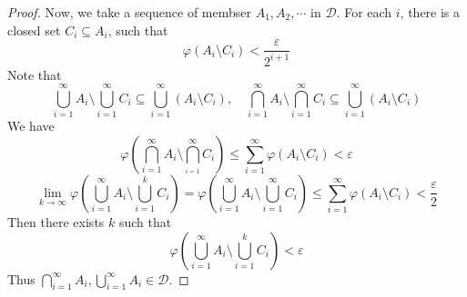 \documentclass[../main.tex]{subfiles}
\begin{document}
\begin{proof}
    Now, we take a sequence of membser \(  A_1,A_2,\cdots   \)  in \(  \mathcal{D}  \). For each \(  i  \), there is a closed set \(  C_{i}\subseteq A_{i}  \), such that \[
     \varphi \left( A_{i}\setminus C_{i} \right)< \frac{ \varepsilon  }{2^{i+ 1} }  
    \]  Note that \[
    \bigcup _{i= 1}^{\infty}A_{i}\setminus \bigcup _{i= 1}^{\infty}C_{i}\subseteq \bigcup _{i= 1}^{\infty}\left( A_{i}\setminus C_{i} \right),\quad \bigcap_{i= 1}^{\infty}A_{i}\setminus \bigcap_{i= 1}^{\infty}C_{i}\subseteq \bigcup _{i= 1}^{\infty}\left( A_{i}\setminus C_{i} \right)    
    \]We have \[
     \varphi \left( \bigcap_{i= 1}^{\infty}A_{i}\setminus \bigcap_{_{i= 1}}^{\infty}C_{i}   \right)\le \sum _{i= 1}^{\infty} \varphi \left( A_{i}\setminus C_{i} \right)<  \varepsilon   
    \] \[
    \lim_{k\to \infty} \varphi \left( \bigcup _{i= 1}^{\infty}A_{i}\setminus \bigcup _{i= 1}^{k}C_{i}  \right)=  \varphi \left( \bigcup _{i= 1}^{\infty}A_{i}\setminus \bigcup _{i= 1}^{\infty}C_{i} \right)\le \sum _{i= 1}^{\infty} \varphi \left( A_{i}\setminus C_{i} \right)< \frac{ \varepsilon  }{2 }    
    \] Then there exists \(  k  \) such that \[
     \varphi \left( \bigcup _{i= 1}^{\infty}A_{i}\setminus \bigcup _{i= 1}^{k}C_{i} \right)<  \varepsilon  
    \] Thus \(  \bigcap_{i= 1}^{\infty}A_{i},\bigcup _{i= 1}^{\infty}A_{i} \in \mathcal{D}   \). 
\end{proof}
\end{document}
